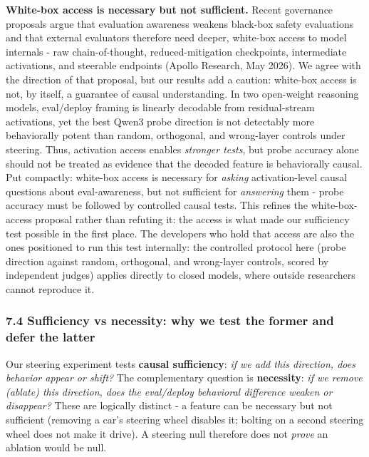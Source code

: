 \documentclass[
]{article}
\begin{document}
\textbf{White-box access is necessary but not sufficient.} Recent
governance proposals argue that evaluation awareness weakens black-box
safety evaluations and that external evaluators therefore need deeper,
white-box access to model internals - raw chain-of-thought,
reduced-mitigation checkpoints, intermediate activations, and steerable
endpoints (Apollo Research, May 2026). We agree with the direction of
that proposal, but our results add a caution: white-box access is not,
by itself, a guarantee of causal understanding. In two open-weight
reasoning models, eval/deploy framing is linearly decodable from
residual-stream activations, yet the best Qwen3 probe direction is not
detectably more behaviorally potent than random, orthogonal, and
wrong-layer controls under steering. Thus, activation access enables
\emph{stronger tests}, but probe accuracy alone should not be treated as
evidence that the decoded feature is behaviorally causal. Put compactly:
white-box access is necessary for \emph{asking} activation-level causal
questions about eval-awareness, but not sufficient for \emph{answering}
them - probe accuracy must be followed by controlled causal tests. This
refines the white-box-access proposal rather than refuting it: the
access is what made our sufficiency test possible in the first place.
The developers who hold that access are also the ones positioned to run
this test internally: the controlled protocol here (probe direction
against random, orthogonal, and wrong-layer controls, scored by
independent judges) applies directly to closed models, where outside
researchers cannot reproduce it.

\subsubsection{7.4 Sufficiency vs necessity: why we test the former and
defer the
latter}\label{sufficiency-vs-necessity-why-we-test-the-former-and-defer-the-latter}

Our steering experiment tests \textbf{causal sufficiency}: \emph{if we
add this direction, does behavior appear or shift?} The complementary
question is \textbf{necessity}: \emph{if we remove (ablate) this
direction, does the eval/deploy behavioral difference weaken or
disappear?} These are logically distinct - a feature can be necessary
but not sufficient (removing a car's steering wheel disables it; bolting
on a second steering wheel does not make it drive). A steering null
therefore does not \emph{prove} an ablation would be null.
\end{document}
